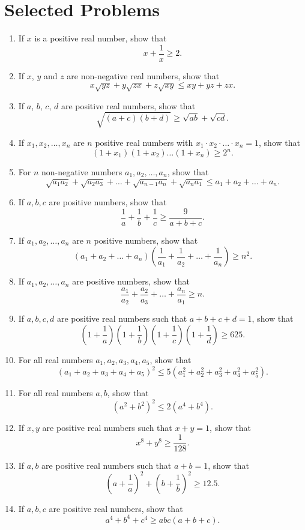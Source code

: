 \documentclass[a4paper,11pt]{article}
\begin{document}
\section{Selected Problems}
\begin{center}
    \begin{enumerate}
        \item If $x$ is a positive real number, show that
        \[
        x+\frac{1}{x} \geq 2.
        \]
        \item If $x$, $y$ and $z$ are non-negative real numbers, show that
        \[
        x\sqrt{yz} + y\sqrt{zx} + z\sqrt{xy} \leq xy + yz + zx.
        \]
        \item If $a$, $b$, $c$, $d$ are positive real numbers, show that
        \[
        \sqrt{(a+c)(b+d)} \geq \sqrt{ab} + \sqrt{cd}.
        \]
        \item If $x_1, x_2, \dots, x_n$ are $n$ positive real numbers with $x_1\cdot x_2 \cdot \ldots \cdot x_n = 1$, show that
        \[
        (1+x_1)(1+x_2)\ldots(1+x_n) \geq 2^n.
        \]
        \item For $n$ non-negative numbers $a_1, a_2, \dots, a_n$, show that
        \[
        \sqrt{a_1a_2} + \sqrt{a_2a_3} + \ldots + \sqrt{a_{n-1}a_n} + \sqrt{a_na_1} \leq a_1 + a_2 + \ldots + a_n. 
        \]
        \item If $a,b,c$ are positive numbers, show that
        \[
        \frac{1}{a} + \frac{1}{b} + \frac{1}{c} \geq \frac{9}{a+b+c}.
        \]
        \item If $a_1, a_2, \dots, a_n$ are $n$ positive numbers, show that
        \[
        (a_1 + a_2 + \dots + a_n) \left(\frac{1}{a_1} + \frac{1}{a_2}  + \dots + \frac{1}{a_n}\right) \geq n^2.
        \]
        \item  If $a_1, a_2, \dots, a_n$ are positive numbers, show that
        \[
        \frac{a_1}{a_2} + \frac{a_2}{a_3} + \dots + \frac{a_n}{a_1} \geq n.
        \]
        \item If $a,b,c,d$ are positive real numbers such that $a+b+c+d=1$, show that
        \[
        \left(1+\frac{1}{a}\right) \left(1+\frac{1}{b}\right) \left(1+\frac{1}{c}\right) \left(1+\frac{1}{d}\right) \geq 625.
        \]
        \item For all real numbers $a_1, a_2, a_3, a_4, a_5$, show that
        \[
        (a_1 + a_2 + a_3 + a_4 + a_5)^2 \leq 5 (a_1^2 + a_2^2 + a_3^2 + a_4^2 + a_5^2).
        \]
        \item For all real numbers $a, b$, show that
        \[
        (a^2 + b^2)^2 \leq 2 (a^4 + b^4).
        \]
        \item If $x,y$ are positive real numbers such that $x + y = 1$, show that
        \[
        x^8 + y^8 \geq \frac{1}{128}.
        \]
        \item If $a, b$ are positive real numbers such that $a + b = 1$, show that
        \[
        \left( a + \frac{1}{a} \right)^2 + \left( b + \frac{1}{b} \right)^2 \geq 12.5.
        \]
        \item If $a, b, c$ are positive real numbers, show that
        \[
        a^4 + b^4 + c^4 \geq abc(a + b + c).
        \]
    \end{enumerate}
\end{center}
\end{document}
